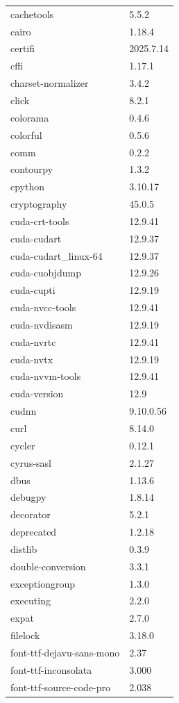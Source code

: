 \begin{longtable}{ll}
    cachetools&5.5.2 \\
    cairo&1.18.4 \\
    certifi&2025.7.14 \\
    cffi&1.17.1 \\
    charset-normalizer&3.4.2 \\
    click&8.2.1 \\
    colorama&0.4.6 \\
    colorful&0.5.6 \\
    comm&0.2.2 \\
    contourpy&1.3.2 \\
    cpython&3.10.17 \\
    cryptography&45.0.5 \\
    cuda-crt-tools&12.9.41 \\
    cuda-cudart&12.9.37 \\
    cuda-cudart\_linux-64&12.9.37 \\
    cuda-cuobjdump&12.9.26 \\
    cuda-cupti&12.9.19 \\
    cuda-nvcc-tools&12.9.41 \\
    cuda-nvdisasm&12.9.19 \\
    cuda-nvrtc&12.9.41 \\
    cuda-nvtx&12.9.19 \\
    cuda-nvvm-tools&12.9.41 \\
    cuda-version&12.9 \\
    cudnn&9.10.0.56 \\
    curl&8.14.0 \\
    cycler&0.12.1 \\
    cyrus-sasl&2.1.27 \\
    dbus&1.13.6 \\
    debugpy&1.8.14 \\
    decorator&5.2.1 \\
    deprecated&1.2.18 \\
    distlib&0.3.9 \\
    double-conversion&3.3.1 \\
    exceptiongroup&1.3.0 \\
    executing&2.2.0 \\
    expat&2.7.0 \\
    filelock&3.18.0 \\
    font-ttf-dejavu-sans-mono&2.37 \\
    font-ttf-inconsolata&3.000 \\
    font-ttf-source-code-pro&2.038 \\

\end{longtable}
